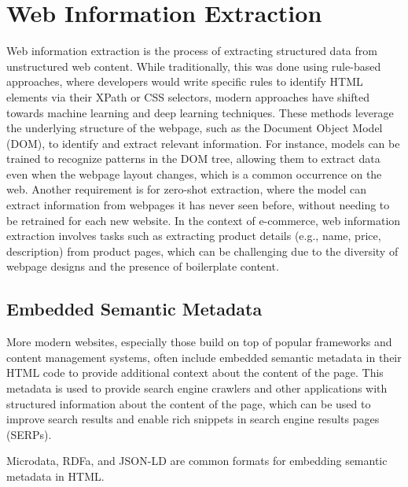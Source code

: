 \section{Web Information Extraction}\label{sec:web_information_extraction}

Web information extraction is the process of extracting structured data from unstructured web content.
While traditionally, this was done using rule-based approaches, where developers would write specific rules to identify HTML elements via their XPath or CSS selectors, modern approaches have shifted towards machine learning and deep learning techniques.
These methods leverage the underlying structure of the webpage, such as the Document Object Model (DOM), to identify and extract relevant information.
For instance, models can be trained to recognize patterns in the DOM tree, allowing them to extract data even when the webpage layout changes, which is a common occurrence on the web.
Another requirement is for zero-shot extraction, where the model can extract information from webpages it has never seen before, without needing to be retrained for each new website.
In the context of e-commerce, web information extraction involves tasks such as extracting product details (e.g., name, price, description) from product pages, which can be challenging due to the diversity of webpage designs and the presence of boilerplate content.

\subsection{Embedded Semantic Metadata}\label{subsec:embedded_semantic_metadata}
More modern websites, especially those build on top of popular frameworks and content management systems, often include embedded semantic metadata in their HTML code to provide additional context about the content of the page.
This metadata is used to provide search engine crawlers and other applications with structured information about the content of the page, which can be used to improve search results and enable rich snippets in search engine results pages (SERPs).

Microdata, RDFa, and JSON-LD are common formats for embedding semantic metadata in HTML\@.

